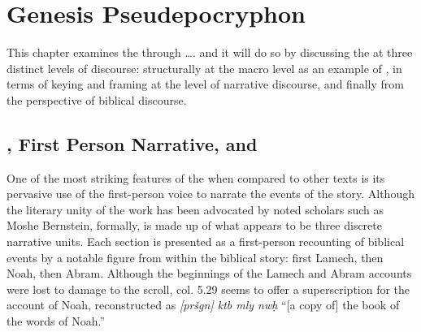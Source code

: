 \hypertarget{genesis-pseudepocryphon}{%
\chapter{Genesis Pseudepocryphon}\label{genesis-pseudepocryphon}}

 This chapter examines the \ga through \ldots{}. and it will do so by discussing the \ga at three distinct levels of discourse: structurally at the macro level as an example of \psy, in terms of keying and framing at the level of narrative discourse, and finally from the perspective of biblical discourse.

 \hypertarget{ga-first-person-narrative-and-psy}{%
 \section{\GA, First Person Narrative, and\Psy}\label{ga-first-person-narrative-and-psy}}

 One of the most striking features of the \ga when compared to other \rwb texts is its pervasive use of the first-person voice to narrate the events of the story. Although the literary unity of the work has been advocated by noted scholars such as Moshe Bernstein, formally, \ga is made up of what appears to be three discrete narrative units.\autocite{bernstein_jbl2009} Each section is presented as a first-person recounting of biblical events by a notable figure from within the biblical story: first Lamech, then Noah, then Abram. Although the beginnings of the Lamech and Abram accounts were lost to damage to the scroll, col. 5.29 seems to offer a superscription for the account of Noah, reconstructed as \emph{{[}pršgn{]} ktb mly nwḥ} ``{[}a copy of{]} the book of the words of Noah.''

